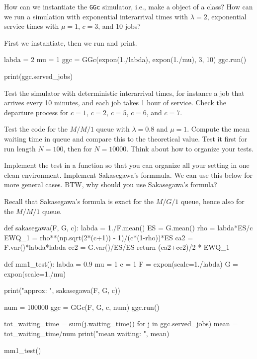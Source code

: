 \documentclass{scrartcl}
\begin{document}
      

\begin{exercise}

How can we instantiate the \texttt{GGc} simulator, i.e., make a object of a class? How can we run a simulation with exponential interarrival times with $\lambda=2$, exponential service times with $\mu=1$, $c=3$, and $10$ jobs?
\begin{solution}
First we instantiate, then we run and print. 
\begin{pyblock}
labda = 2
mu = 1  
ggc = GGc(expon(1./labda), expon(1./mu), 3, 10)
ggc.run()

print(ggc.served_jobs)
\end{pyblock}
\end{solution}
\end{exercise}

\begin{exercise}
Test the simulator with deterministic interarrival times, for instance a job that arrives every 10 minutes, and each job takes 1 hour of service. Check the departure process for $c=1$, $c=2$, $c=5$, $c=6$, and $c=7$. 
\end{exercise}


\begin{exercise}
  Test the code for the $M/M/1$ queue with $\lambda=0.8$ and $\mu=1$. Compute the mean waiting time in queue and compare this to the theoretical value. Test it first for run length $N=100$, then for $N=10000$. Think about how to organize your tests. 
\hintsymbol\begin{hint}
    Implement the test in a function so that you can organize all your setting in one clean environment. Implement Sakasegawa's formmula. We can use this below for more general cases. BTW, why should you use Sakasegawa's formula?
  \end{hint}
  \begin{solution}
Recall that Sakasegawa's formula is exact for the $M/G/1$ queue, hence also for the $M/M/1$ queue. 

\begin{pyblock}

def sakasegawa(F, G, c):
    labda = 1./F.mean()
    ES = G.mean()
    rho = labda*ES/c
    EWQ_1 = rho**(np.sqrt(2*(c+1)) - 1)/(c*(1-rho))*ES
    ca2 = F.var()*labda*labda
    ce2 = G.var()/ES/ES
    return (ca2+ce2)/2 * EWQ_1
    

def mm1_test():
    labda = 0.9
    mu = 1
    c = 1
    F = expon(scale=1./labda)
    G = expon(scale=1./mu)

    print("approx: ", sakasegawa(F, G, c))

    num = 100000
    ggc = GGc(F, G, c, num)
    ggc.run()

    tot_waiting_time = sum(j.waiting_time() for j in ggc.served_jobs)
    mean = tot_waiting_time/num
    print("mean waiting: ", mean)
  

mm1_test()
\end{pyblock}

  \end{solution}
\end{exercise}
\end{document}
